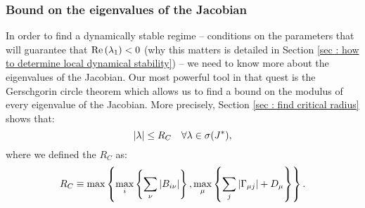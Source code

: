 \documentclass[12pt, titlepage]{report}
\begin{document}
\subsubsection{Bound on the eigenvalues of the Jacobian}
In order to find a dynamically stable regime -- \ie conditions on the parameters that will guarantee that $\text{Re}\left(\lambda_1\right) < 0$ (why this matters is detailed in Section \ref{sec : how to determine local dynamical stability}) -- we need to know more about the eigenvalues of the Jacobian. Our most powerful tool in that quest is the Gerschgorin circle theorem \cite{gerschgorin_uber_1931} which allows us to find a bound on the modulus of every eigenvalue of the Jacobian.
More precisely, Section \ref{sec : find critical radius} shows that:
\begin{equation}
\left|{\lambda}\right| \leq R_C \quad \forall \lambda \in \sigma(J^*), \label{eq: overall bound on lambda}
\end{equation}
where we defined the  $R_C$ as:
\begin{equation}
R_C \equiv \max\left\{\max_i\left\{\sum_\nu \left|{B_{i\nu}}\right|\right\}, \max_\mu\left\{\sum_j \left|{\Gamma_{\mu j}}\right|+D_\mu\right\}\right\}.
\end{equation}
\end{document}
